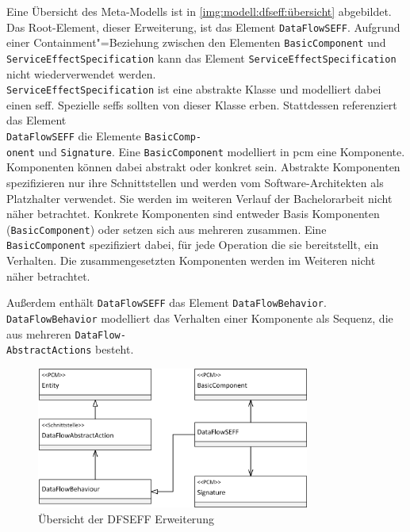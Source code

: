 Eine Übersicht des Meta-Modells ist in \autoref{img:modell:dfseff:übersicht} abgebildet. Das Root-Element, dieser Erweiterung, ist das Element \texttt{DataFlowSEFF}. Aufgrund einer Containment"=Beziehung zwischen den Elementen \texttt{BasicComponent} und \texttt{ServiceEffectSpecification} kann das Element \texttt{ServiceEffectSpecification} nicht wiederverwendet werden. \\\texttt{ServiceEffectSpecification} ist eine abstrakte Klasse und modelliert dabei einen \gls{seff}. Spezielle \gls{seff}s sollten von dieser Klasse erben. Stattdessen referenziert das Element \\\texttt{DataFlowSEFF} die Elemente \texttt{BasicComp-\\onent} und \texttt{Signature}. Eine \texttt{BasicComponent} modelliert in \gls{pcm} eine Komponente. Komponenten können dabei abstrakt oder konkret sein. Abstrakte Komponenten spezifizieren nur ihre Schnittstellen und werden vom Software-Architekten als Platzhalter verwendet. Sie werden im weiteren Verlauf der Bachelorarbeit nicht näher betrachtet. Konkrete Komponenten sind entweder Basis Komponenten (\texttt{BasicComponent}) oder setzen sich aus mehreren zusammen. Eine \texttt{BasicComponent} spezifiziert dabei, für jede Operation die sie bereitstellt, ein Verhalten. Die zusammengesetzten Komponenten werden im Weiteren nicht näher betrachtet. \par 
Außerdem enthält \texttt{DataFlowSEFF} das Element \texttt{DataFlowBehavior}. \texttt{DataFlowBehavior} modelliert das Verhalten einer Komponente als Sequenz, die aus mehreren \texttt{DataFlow-\\AbstractActions} besteht.
\begin{figure}[h]
	\centering
  	\includegraphics[width=0.8\textwidth]{images/meta_dfseff_ubersicht.png}
	\caption{Übersicht der DFSEFF Erweiterung}
	\label{img:modell:dfseff:übersicht}
\end{figure}
